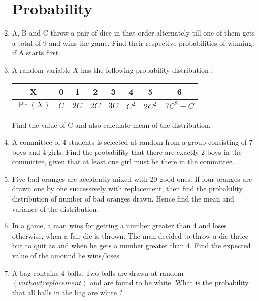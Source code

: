\documentclass[12pt,-letter paper]{article}
\theoremstyle{remark}
\providecommand{\pr}[1]{\ensuremath{\Pr\left(#1\right)}}
\providecommand{\brak}[1]{\ensuremath{\left(#1\right)}}
\providecommand{\pr}[1]{\ensuremath{\Pr\left(#1\right)}}
\begin{document}
\begin{enumerate}
            \section{Probability}
      \item A, B and C throw a pair of dice in that order alternately till one of them gets a total of 9 and wins the game. Find their respective probabilities of winning, if A starts first.
      \item A random variable $X$ has the following probability distribution :
            \begin{center}
                  \begin{table}[h!]
                        \begin{tabular}{|c |c| c | c | c | c | c | c |}
                              \hline
                              X        & 0   & 1    & 2    & 3    & 4     & 5      & 6         \\
                              \hline
                              $\pr{X}$ & $C$ & $2C$ & $2C$ & $3C$ & $C^2$ & $2C^2$ & $7C^2 +C$ \\
                              \hline
                        \end{tabular}
                  \end{table}
            \end{center}
            Find the value of C and also calculate mean of the distribution.
      \item A committee of 4 students is selected at random from a group consisting of 7 boys and 4 girls. Find the probability that there are exactly 2 boys in the committee, given that at least one girl must be there in the committee.
      \item Five bad oranges are accidently mixed with 20 good ones. If four oranges are drawn one by one successively with replacement, then find the probability distribution of number of bad oranges drawn. Hence find the mean and variance of the distribution.
      \item In a game, a man wins  for getting a number greater than 4 and loses  otherwise, when a fair die is thrown. The man decided to throw a die thrice but to quit as and when he gets a number greater than 4. Find the expected value of the amound he wins/loses.
      \item A bag contains 4 balls. Two balls are drawn at random \brak{without replacement} and are found to be white. What is the probability that all balls in the bag are white ?

\end{enumerate}
\end{document}
